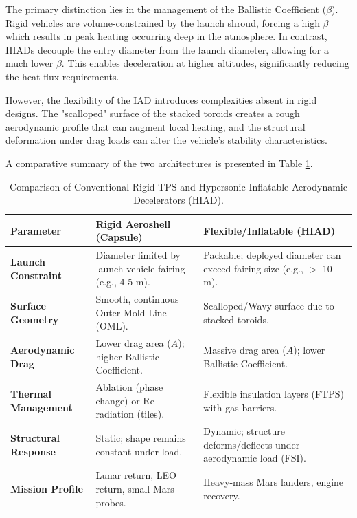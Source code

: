 The primary distinction lies in the management of the Ballistic Coefficient ($\beta$). Rigid vehicles are volume-constrained by the launch shroud, forcing a high $\beta$ which results in peak heating occurring deep in the atmosphere. In contrast, HIADs decouple the entry diameter from the launch diameter, allowing for a much lower $\beta$. This enables deceleration at higher altitudes, significantly reducing the heat flux requirements.

However, the flexibility of the IAD introduces complexities absent in rigid designs. The "scalloped" surface of the stacked toroids creates a rough aerodynamic profile that can augment local heating, and the structural deformation under drag loads can alter the vehicle's stability characteristics.

A comparative summary of the two architectures is presented in Table \ref{tab:tps_comparison}.

\begin{table}[H]
    \centering
    \caption{Comparison of Conventional Rigid TPS and Hypersonic Inflatable Aerodynamic Decelerators (HIAD).}
    \label{tab:tps_comparison}
    \begin{tabularx}{\textwidth}{|l|X|X|}
        \hline
        \rowcolor{gray!20} \textbf{Parameter} & \textbf{Rigid Aeroshell (Capsule)} & \textbf{Flexible/Inflatable (HIAD)} \\ \hline
        \textbf{Launch Constraint} & Diameter limited by launch vehicle fairing (e.g., 4-5 m). & Packable; deployed diameter can exceed fairing size (e.g., $>$ 10 m). \\ \hline
        \textbf{Surface Geometry} & Smooth, continuous Outer Mold Line (OML). & Scalloped/Wavy surface due to stacked toroids. \\ \hline
        \textbf{Aerodynamic Drag} & Lower drag area ($A$); higher Ballistic Coefficient. & Massive drag area ($A$); lower Ballistic Coefficient. \\ \hline
        \textbf{Thermal Management} & Ablation (phase change) or Re-radiation (tiles). & Flexible insulation layers (FTPS) with gas barriers. \\ \hline
        \textbf{Structural Response} & Static; shape remains constant under load. & Dynamic; structure deforms/deflects under aerodynamic load (FSI). \\ \hline %
        \textbf{Mission Profile} & Lunar return, LEO return, small Mars probes. & Heavy-mass Mars landers, engine recovery. \\ \hline
    \end{tabularx}
\end{table}
